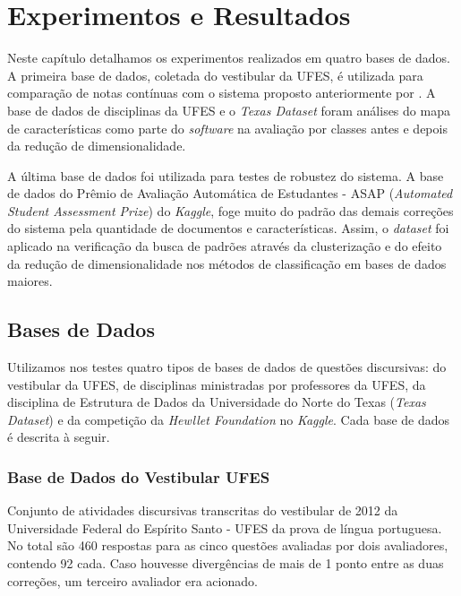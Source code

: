 
\chapter{Experimentos e Resultados}\label{cap5}
Neste capítulo detalhamos os experimentos realizados em quatro bases de dados. A primeira base de dados, coletada do vestibular da UFES, é utilizada para comparação de notas contínuas com o sistema proposto anteriormente por . A base de dados de disciplinas da UFES e o \textit{Texas Dataset} foram análises do mapa de características como parte do \textit{software} na avaliação por classes antes e depois da redução de dimensionalidade. 

A última base de dados foi utilizada para testes de robustez do sistema. A base de dados do Prêmio de Avaliação Automática de Estudantes - ASAP (\textit{Automated Student Assessment Prize}) do \textit{Kaggle}, foge muito do padrão das demais correções do sistema pela quantidade de documentos e características. Assim, o \textit{dataset} foi aplicado na verificação da busca de padrões através da clusterização e do efeito da redução de dimensionalidade nos métodos de classificação em bases de dados maiores.

\section{Bases de Dados}\label{ss-databases}
Utilizamos nos testes quatro tipos de bases de dados de questões discursivas: do vestibular da UFES, de disciplinas ministradas por professores da UFES, da disciplina de Estrutura de Dados da Universidade do Norte do Texas (\textit{Texas Dataset}) e da competição da \textit{Hewllet Foundation} no \textit{Kaggle}. Cada base de dados é descrita à seguir.

\subsection{Base de Dados do Vestibular UFES} \label{vest-ufes-db}
Conjunto de atividades discursivas transcritas do vestibular de 2012 da Universidade Federal do Espírito Santo - UFES da prova de língua portuguesa. No total são 460 respostas para as cinco questões avaliadas por dois avaliadores, contendo 92 cada. Caso houvesse divergências de mais de 1 ponto entre as duas correções, um terceiro avaliador era acionado.

